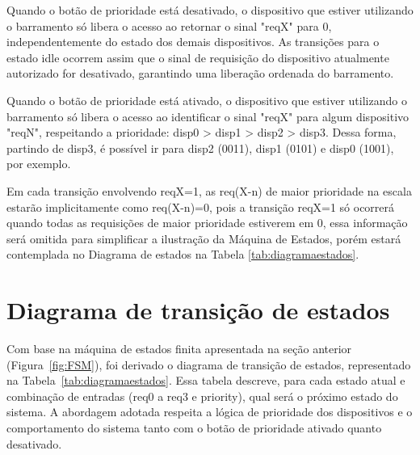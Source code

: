 \documentclass[oneside]{uffstex}
\begin{document}
Quando o botão de prioridade está desativado, o dispositivo que estiver utilizando o barramento só libera o acesso ao retornar o sinal "reqX" para 0, independentemente do estado dos demais dispositivos. As transições para o estado idle ocorrem assim que o sinal de requisição do dispositivo atualmente autorizado for desativado, garantindo uma liberação ordenada do barramento.

Quando o botão de prioridade está ativado, o dispositivo que estiver utilizando o barramento só libera o acesso ao identificar o sinal "reqX" para algum dispositivo "reqN", respeitando a prioridade: disp0 > disp1 > disp2 > disp3. Dessa forma, partindo de disp3, é possível ir para disp2 (0011), disp1 (0101) e disp0 (1001), por exemplo.

Em cada transição envolvendo reqX=1, as req(X-n) de maior prioridade na escala estarão implicitamente como req(X-n)=0, pois a transição reqX=1 só ocorrerá quando todas as requisições de maior prioridade estiverem em 0, essa informação será omitida para simplificar a ilustração da Máquina de Estados, porém estará contemplada no Diagrama de estados na Tabela \ref{tab:diagramaestados}.
\section{Diagrama de transição de estados}

Com base na máquina de estados finita apresentada na seção anterior (Figura~\ref{fig:FSM}), foi derivado o diagrama de transição de estados, representado na Tabela~\ref{tab:diagramaestados}. Essa tabela descreve, para cada estado atual e combinação de entradas (req0 a req3 e priority), qual será o próximo estado do sistema. A abordagem adotada respeita a lógica de prioridade dos dispositivos e o comportamento do sistema tanto com o botão de prioridade ativado quanto desativado.
\end{document}
